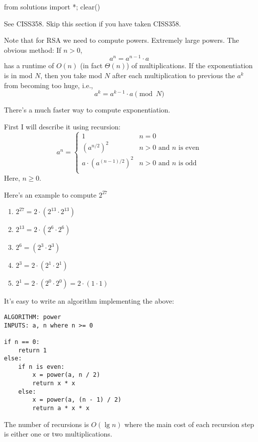 \begin{python0}
from solutions import *; clear()
\end{python0}

See CISS358. Skip this section if you have taken CISS358.

Note that for RSA we need to compute powers. Extremely large
powers.
The obvious method: If $n > 0$,
\[
a^n = a^{n-1} \cdot a
\]
has a runtime of $O(n)$ (in fact $\Theta(n)$) of multiplications.
If the exponentiation is in mod $N$, then
you take mod $N$ after each multiplication to previous
the $a^k$ from becoming too huge, i.e.,
\[
a^k = a^{k-1} \cdot a \pmod{N}
\]

There's a much faster way to compute exponentiation.

First I will describe it using recursion:
\[
a^n =
\begin{cases}
  1 & n = 0 \\
  \left( a^{n/2} \right)^2 & n > 0 \text{ and $n$ is even} \\
  a \cdot \left( a^{(n - 1)/2} \right)^2 & n > 0 \text{ and $n$ is odd} \\
\end{cases}
\]
Here, $n \geq 0$.

\begin{eg}
Here's an example to compute $2^{27}$
\begin{enumerate}[nosep]
\item $2^{27} = 2 \cdot \left( 2^{13} \cdot 2^{13} \right) $
\item $2^{13} = 2 \cdot \left( 2^{6} \cdot 2^{6} \right) $
\item $2^6 = \left( 2^3 \cdot 2^3 \right)$
\item $2^3 = 2 \cdot \left( 2^1 \cdot 2^1 \right)$
\item $2^1 = 2 \cdot \left( 2^0 \cdot 2^0 \right) = 2 \cdot \left( 1 \cdot 1 \right)$
\end{enumerate}
\end{eg}

It's easy to write an algorithm implementing the above:
\begin{Verbatim}[frame=single,fontsize=\footnotesize]
ALGORITHM: power
INPUTS: a, n where n >= 0

if n == 0:
    return 1
else:
    if n is even: 
        x = power(a, n / 2)
        return x * x
    else:
        x = power(a, (n - 1) / 2)
        return a * x * x
\end{Verbatim}
The number of recursions is $O(\lg n)$ where the main
cost of each recursion step is either one or two multiplications.

